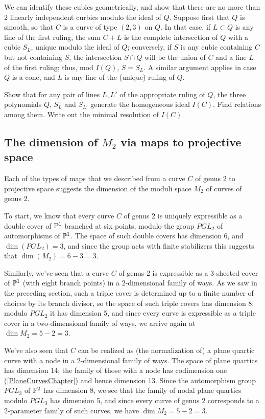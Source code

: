 We can identify these cubics geometrically, and show that there are no more than 2 linearly independent curbics modulo the ideal of $Q$. Suppose first that $Q$ is smooth, so that $C$ is a curve of type $(2,3)$ on $Q$. In that case, if $L \subset Q$ is any line of the first ruling, the sum $C+L$ is the complete intersection of $Q$ with a cubic $S_L$, unique modulo the ideal of $Q$; conversely, if $S$ is any cubic containing $C$ but not containing $S$, the intersection $S \cap Q$ will be the union of $C$ and a line $L$ of the first ruling; thus, mod $I(Q)$, $S = S_L$. A similar argument applies in case $Q$ is a cone, and $L$ is any line of the (unique) ruling of $Q$.

\begin{exercise}
Show that for any pair of lines $L, L'$ of the appropriate ruling of $Q$, the three polynomials $Q$, $S_L$ and $S_{L'}$ generate the homogeneous ideal $I(C)$. Find relations among them. Write out the minimal resolution of $I(C)$.
\end{exercise}



\subsection{The dimension of $M_2$ via maps to projective space}

Each of the types of maps that we described from a curve $C$ of genus 2 to projective space suggests the dimension of the moduli space $M_2$ of curves of genus 2.

To start, we know that every curve $C$ of genus 2 is uniquely expressible as a double cover of $\PP^1$ branched at six points, modulo the group $PGL_2$ of automorphisms of $\PP^1$. The space of such double covers has dimension 6, and $\dim(PGL_2) = 3$, and since the group acts with finite stabilizers this suggests that $\dim(M_2) = 6-3 = 3$.

Similarly, we've seen that a curve $C$ of genus 2 is expressible as a 3-sheeted cover of $\PP^1$ (with eight branch points) in a 2-dimensional family of ways. As we saw in the preceding section, such a triple cover is determined up to a finite number of choices by its branch divisor, so the space of such triple covers has dimension 8; modulo $PGL_2$ it has dimension 5, and since every curve is expressible as a triple cover in a two-dimensional family of ways, we arrive again at $\dim M_2 = 5-2 = 3$.

We've also seen that $C$ can be realized as (the normalization of) a plane quartic curve with a node in a 2-dimensional family of ways. The space of plane quartics has dimension 14; the family of those with a node has codimension one (\ref{PlaneCurvesChapter}) and hence dimension 13. Since  the automorphism group $PGL_3$ of $\PP^2$ has dimension 8, we see that the family of nodal plane quartics modulo $PGL_3$ has dimension 5, and since every curve of genus 2 corresponds to a 2-parameter family of such curves, we have $\dim M_2 = 5-2=3$.

